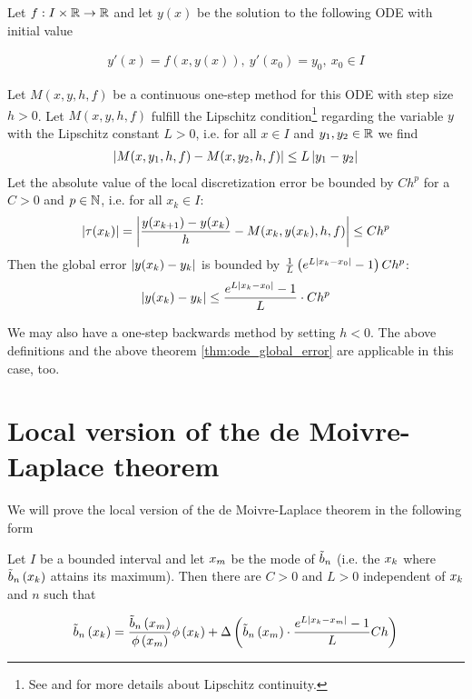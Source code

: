 \begin{theorem} \label{thm:ode_global_error}
  Let $f:I\times \mathbb R\to\mathbb R$ and let $y(x)$ be the solution to the following ODE with initial value

  \begin{align}
    y'(x)=f(x,y(x)),\ y'(x_0)=y_0,\ x_0 \in I
  \end{align}

  Let $M(x,y,h,f)$ be a continuous one-step method for this ODE with step size $h > 0$. Let $M(x,y,h,f)$ fulfill the Lipschitz condition\footnote{See \cite[p. 467]{stoer} and \cite{wiki:lipschitz} for more details about Lipschitz continuity.} regarding the variable $y$ with the Lipschitz constant $L > 0$, i.e. for all $x\in I$ and $y_1,y_2\in\mathbb R$ we find
  \begin{align}
    \left|{M(x,y_1,h,f)-M(x,y_2,h,f)}\right| \le L \left|{y_1-y_2}\right|
  \end{align}
  Let the absolute value of the local discretization error be bounded by $C h^p$ for a $C > 0$ and $p\in \mathbb N$, i.e. for all $x_k \in I$:
  \begin{align}
    \left|{\tau(x_k)}\right| = \left|{\frac{y(x_{k+1})-y(x_k)}h - M(x_k,y(x_k),h,f)}\right| \le Ch^p
  \end{align}
  Then the global error $\left|{y(x_k)-y_k}\right|$ is bounded by $\frac 1L \left( {e^{L\left|{x_k-x_0}\right|}-1} \right) C h^p$:
  \begin{align}
    \left|{y(x_k)-y_k}\right| \le \frac{e^{L\left|{x_k-x_0}\right|}-1}{L} \cdot Ch^p
  \end{align}
\end{theorem}

We may also have a one-step backwards method by setting $h < 0$. The above definitions and the  above theorem \ref{thm:ode_global_error} are applicable in this case, too.

\section{Local version of the de Moivre-Laplace theorem}

We will prove the local version of the de Moivre-Laplace theorem in the following form

\newcommand*{\bnp}{\bb{\xnp}}
\newcommand*{\knp}{m}
\newcommand*{\xnp}{\x[\knp]}
\newcommand*{\phin}[2][n]{y_{#1}\left({#2}\right)}
\newcommand*{\dphin}[2][n]{y_{#1}'\left({#2}\right)}

\begin{theorem}
  Let $I$ be a bounded interval and let $\xnp$ be the mode of $\tilde b_{n}$ (i.e. the $x_{k}$ where $\tilde b_{n}\left({x_{k}}\right)$ attains its maximum).  Then there are $C > 0$ and $L > 0$ independent of $x_{k}$ and $n$ such that

  \begin{align}
    \bb{\x} = \frac{\bnp}{\fphi{\xnp}}\fphi{\x} + \bigabs{{\bnp}\cdot \frac{\fe{L\abs{\x-\xnp}}-1}L Ch}
  \end{align}
\end{theorem}

